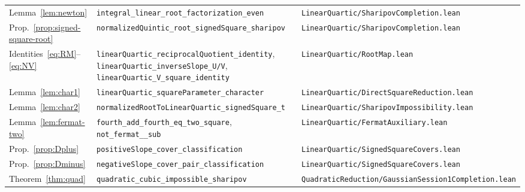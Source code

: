 \documentclass[10pt]{article}
\theoremstyle{definition}
\theoremstyle{remark}
\begin{document}
\begin{small}
\begin{longtable}{@{}p{3.6cm}p{6.3cm}p{5.4cm}@{}}
Lemma~\ref{lem:newton} & \texttt{integral\_\allowbreak linear\_\allowbreak root\_\allowbreak factorization\_\allowbreak even} & \texttt{Linear\allowbreak Quartic/\allowbreak Sharipov\allowbreak Completion.\allowbreak lean}\\
Prop.~\ref{prop:signed-square-root} & \texttt{normalized\allowbreak Quintic\_\allowbreak root\_\allowbreak signed\allowbreak Square\_\allowbreak sharipov} & \texttt{Linear\allowbreak Quartic/\allowbreak Sharipov\allowbreak Completion.\allowbreak lean}\\
Identities~\eqref{eq:RM}--\eqref{eq:NV} & \texttt{linear\allowbreak Quartic\_\allowbreak reciprocal\allowbreak Quotient\_\allowbreak identity}, \texttt{linear\allowbreak Quartic\_\allowbreak inverse\allowbreak Slope\_\allowbreak U/\allowbreak V}, \texttt{linear\allowbreak Quartic\_\allowbreak V\_\allowbreak square\_\allowbreak identity} & \texttt{Linear\allowbreak Quartic/\allowbreak Root\allowbreak Map.\allowbreak lean}\\
Lemma~\ref{lem:char1} & \texttt{linear\allowbreak Quartic\_\allowbreak square\allowbreak Parameter\_\allowbreak character} & \texttt{Linear\allowbreak Quartic/\allowbreak Direct\allowbreak Square\allowbreak Reduction.\allowbreak lean}\\
Lemma~\ref{lem:char2} & \texttt{normalized\allowbreak Root\allowbreak To\allowbreak Linear\allowbreak Quartic\_\allowbreak signed\allowbreak Square\_\allowbreak t} & \texttt{Linear\allowbreak Quartic/\allowbreak Sharipov\allowbreak Impossibility.\allowbreak lean}\\
Lemma~\ref{lem:fermat-two} & \texttt{fourth\_\allowbreak add\_\allowbreak fourth\_\allowbreak eq\_\allowbreak two\_\allowbreak square}, \texttt{not\_\allowbreak fermat\_\allowbreak 4\_\allowbreak sub} & \texttt{Linear\allowbreak Quartic/\allowbreak Fermat\allowbreak Auxiliary.\allowbreak lean}\\
Prop.~\ref{prop:Dplus} & \texttt{positive\allowbreak Slope\_\allowbreak cover\_\allowbreak classification} & \texttt{Linear\allowbreak Quartic/\allowbreak Signed\allowbreak Square\allowbreak Covers.\allowbreak lean}\\
Prop.~\ref{prop:Dminus} & \texttt{negative\allowbreak Slope\_\allowbreak cover\_\allowbreak pair\_\allowbreak classification} & \texttt{Linear\allowbreak Quartic/\allowbreak Signed\allowbreak Square\allowbreak Covers.\allowbreak lean}\\
\midrule
Theorem~\ref{thm:quad} & \texttt{quadratic\_\allowbreak cubic\_\allowbreak impossible\_\allowbreak sharipov} & \texttt{Quadratic\allowbreak Reduction/\allowbreak Gaussian\allowbreak Session1\allowbreak Completion.\allowbreak lean}\\

\end{longtable}
\end{small}
\end{document}
